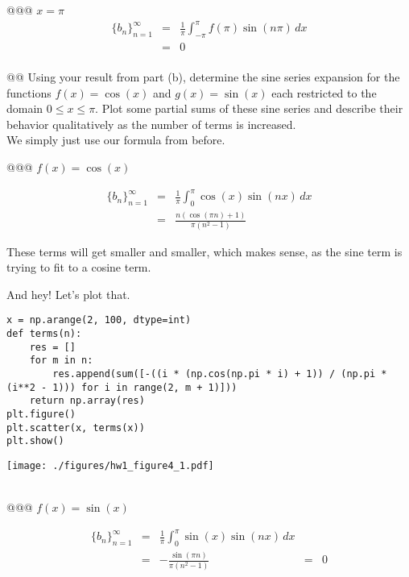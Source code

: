 \documentclass[10pt]{article}
\begin{document}
\begin{easylist}[enumerate]
    @@@ $x = \pi$
    \begin{align*}
         {\{b_n\}}_{n=1}^\infty &=& \frac{1}{\pi} \int_{-\pi}^\pi f(\pi) \sin(n\pi) \, dx\\
         &=& 0\\
    \end{align*}

    @@ Using your result from part (b), determine the sine series expansion for the functions $f(x)=\cos(x)$ and
    $g(x)=\sin(x)$ each restricted to the domain $0 \le x \le \pi$. Plot some partial sums of these sine series and
    describe their behavior qualitatively as the number of terms is increased.\\

    We simply just use our formula from before.

    @@@ $f(x) = \cos(x)$

    \begin{align*}
        {\{b_n\}}_{n=1}^\infty &=& \frac{1}{\pi} \int_0^\pi \cos(x) \sin(nx) \, dx\\
        &=& \frac{n (\cos (\pi  n)+1)}{\pi \left(n^2-1\right)}
    \end{align*}

    These terms will get smaller and smaller, which makes sense, as the sine term is trying to fit to a cosine term.

    And hey! Let's plot that.\\

\hfill\begin{minipage}{\dimexpr\textwidth-1cm}

\begin{verbatim}
x = np.arange(2, 100, dtype=int)
def terms(n):
    res = []
    for m in n:
        res.append(sum([-((i * (np.cos(np.pi * i) + 1)) / (np.pi *
(i**2 - 1))) for i in range(2, m + 1)]))
    return np.array(res)
plt.figure()
plt.scatter(x, terms(x))
plt.show()
\end{verbatim}
\texttt{[image: ./figures/hw1\_figure4\_1.pdf]}

\xdef\tpd{\the\prevdepth}
\end{minipage}\\

    @@@ $f(x) = \sin(x)$

    \begin{align*}
        {\{b_n\}}_{n=1}^\infty &=& \frac{1}{\pi} \int_0^\pi \sin(x) \sin(nx) \, dx\\
        &=& -\frac{\sin (\pi  n)}{\pi  \left(n^2-1\right)}
        &=& 0\\
    \end{align*}


\end{easylist}
\end{document}
